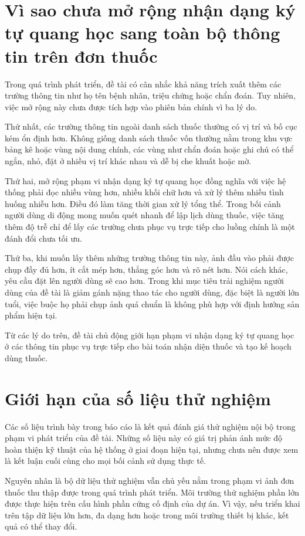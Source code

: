 \documentclass[12pt,a4paper]{report}
\begin{document}
\section{Vì sao chưa mở rộng nhận dạng ký tự quang học sang toàn bộ thông tin trên đơn thuốc}

Trong quá trình phát triển, đề tài có cân nhắc khả năng trích xuất thêm các trường thông tin như họ tên bệnh nhân, triệu chứng hoặc chẩn đoán. Tuy nhiên, việc mở rộng này chưa được tích hợp vào phiên bản chính vì ba lý do.

Thứ nhất, các trường thông tin ngoài danh sách thuốc thường có vị trí và bố cục kém ổn định hơn. Không giống danh sách thuốc vốn thường nằm trong khu vực bảng kê hoặc vùng nội dung chính, các vùng như chẩn đoán hoặc ghi chú có thể ngắn, nhỏ, đặt ở nhiều vị trí khác nhau và dễ bị che khuất hoặc mờ.

Thứ hai, mở rộng phạm vi nhận dạng ký tự quang học đồng nghĩa với việc hệ thống phải đọc nhiều vùng hơn, nhiều khối chữ hơn và xử lý thêm nhiều tình huống nhiễu hơn. Điều đó làm tăng thời gian xử lý tổng thể. Trong bối cảnh người dùng di động mong muốn quét nhanh để lập lịch dùng thuốc, việc tăng thêm độ trễ chỉ để lấy các trường chưa phục vụ trực tiếp cho luồng chính là một đánh đổi chưa tối ưu.

Thứ ba, khi muốn lấy thêm những trường thông tin này, ảnh đầu vào phải được chụp đầy đủ hơn, ít cắt mép hơn, thẳng góc hơn và rõ nét hơn. Nói cách khác, yêu cầu đặt lên người dùng sẽ cao hơn. Trong khi mục tiêu trải nghiệm người dùng của đề tài là giảm gánh nặng thao tác cho người dùng, đặc biệt là người lớn tuổi, việc buộc họ phải chụp ảnh quá chuẩn là không phù hợp với định hướng sản phẩm hiện tại.

Từ các lý do trên, đề tài chủ động giới hạn phạm vi nhận dạng ký tự quang học ở các thông tin phục vụ trực tiếp cho bài toán nhận diện thuốc và tạo kế hoạch dùng thuốc.

\section{Giới hạn của số liệu thử nghiệm}

Các số liệu trình bày trong báo cáo là kết quả đánh giá thử nghiệm nội bộ trong phạm vi phát triển của đề tài. Những số liệu này có giá trị phản ánh mức độ hoàn thiện kỹ thuật của hệ thống ở giai đoạn hiện tại, nhưng chưa nên được xem là kết luận cuối cùng cho mọi bối cảnh sử dụng thực tế.

Nguyên nhân là bộ dữ liệu thử nghiệm vẫn chủ yếu nằm trong phạm vi ảnh đơn thuốc thu thập được trong quá trình phát triển. Môi trường thử nghiệm phần lớn được thực hiện trên cấu hình phần cứng cố định của dự án. Vì vậy, nếu triển khai trên tập dữ liệu lớn hơn, đa dạng hơn hoặc trong môi trường thiết bị khác, kết quả có thể thay đổi.
\end{document}
